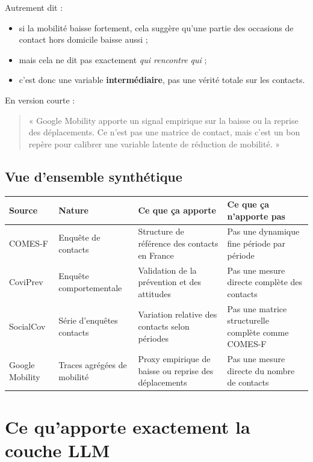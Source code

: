 \documentclass[11pt,a4paper]{article}
\begin{document}
Autrement dit :
\begin{itemize}
\item si la mobilité baisse fortement, cela suggère qu'une partie des occasions de contact hors domicile baisse aussi ;
\item mais cela ne dit pas exactement \emph{qui rencontre qui} ;
\item c'est donc une variable \textbf{intermédiaire}, pas une vérité totale sur les contacts.
\end{itemize}

En version courte :
\begin{quote}
« Google Mobility apporte un signal empirique sur la baisse ou la reprise des déplacements. Ce n'est pas une matrice de contact, mais c'est un bon repère pour calibrer une variable latente de réduction de mobilité. »
\end{quote}

\subsection*{Vue d'ensemble synthétique}

\begin{center}
\begin{tabularx}{\textwidth}{>{\raggedright\arraybackslash}p{2.3cm} >{\raggedright\arraybackslash}p{3.5cm} >{\raggedright\arraybackslash}X >{\raggedright\arraybackslash}X}
\toprule
Source & Nature & Ce que ça apporte & Ce que ça n'apporte pas \\
\midrule
COMES-F & Enquête de contacts & Structure de référence des contacts en France & Pas une dynamique fine période par période \\
CoviPrev & Enquête comportementale & Validation de la prévention et des attitudes & Pas une mesure directe complète des contacts \\
SocialCov & Série d'enquêtes contacts & Variation relative des contacts selon périodes & Pas une matrice structurelle complète comme COMES-F \\
Google Mobility & Traces agrégées de mobilité & Proxy empirique de baisse ou reprise des déplacements & Pas une mesure directe du nombre de contacts \\
\bottomrule
\end{tabularx}
\end{center}

\section{Ce qu'apporte exactement la couche LLM}
\end{document}
